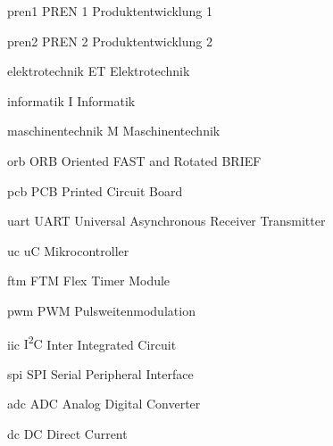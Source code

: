 \newacronym
  {pren1}                 %
  {PREN 1}                %
  {Produktentwicklung 1}  %

\newacronym
  {pren2}                 %
  {PREN 2}                %
  {Produktentwicklung 2}  %

\newacronym
  {elektrotechnik}                    %
  {ET}                    %
  {Elektrotechnik}        %

\newacronym
  {informatik}             %
  {I}                      %
  {Informatik}             %

\newacronym
  {maschinentechnik}       %
  {M}                      %
  {Maschinentechnik}       %

\newacronym
  {orb}                                    %
  {ORB}                                    %
  {Oriented FAST and Rotated BRIEF}        %

\newacronym
  {pcb}                         %
  {PCB}                         %
  {Printed Circuit Board}       %

\newacronym
  {uart}       %
  {UART}                      %
  {Universal Asynchronous Receiver Transmitter}       %

\newacronym
  {uc}       %
  {uC}                      %
  {Mikrocontroller}       %

\newacronym
  {ftm}       %
  {FTM}                      %
  {Flex Timer Module}       %

\newacronym
  {pwm}                 %
  {PWM}                %
  {Pulsweitenmodulation}  %

\newacronym
  {iic}                 %
  {I\textsuperscript{2}C}     %
  {Inter Integrated Circuit}  %


\newacronym
  {spi}                 %
  {SPI}                %
  {Serial Peripheral Interface}  %

\newacronym
  {adc}                 %
  {ADC}                %
  {Analog Digital Converter}  %

\newacronym
  {dc}                 %
  {DC}                %
  {Direct Current}  %


